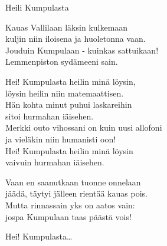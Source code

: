 \begin{song}{Heili Kumpulasta}


    Kauas Vallilaan läksin kulkemaan\\
    kuljin niin iloisena ja huoletonna vaan.\\
    Jouduin Kumpulaan - kuinkas sattuikaan!\\
    Lemmenpiston sydämeeni sain.

    Hei! Kumpulasta heilin minä löysin,\\
    löysin heilin niin matemaattisen.\\
    Hän kohta minut puhui laskareihin\\
    sitoi hurmahan iäisehen.\\
    Merkki outo vihossani on kuin uusi allofoni\\
    ja vieläkin niin humanisti oon!\\
    Hei! Kumpulasta heilin minä löysin\\
    vaivuin hurmahan iäisehen.

    Vaan en saanutkaan tuonne onnelaan\\
    jäädä, täytyi jälleen rientää kauas pois.\\
    Mutta rinnassain yks on aatos vain:\\
    jospa Kumpulaan taas päästä vois!

    Hei! Kumpulasta\dots

\end{song}